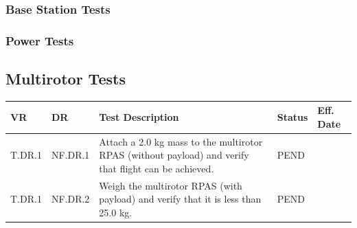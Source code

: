 \documentclass[10pt,letterpaper]{article}
\begin{document}
\subsubsection{Base Station Tests}
\subsubsection{Power Tests}

\subsection{Multirotor Tests}
\begin{table}[H]
\begin{tabular}{ |p{1.1cm}|p{1.3cm}|p{9cm}|p{1.1cm}|p{1.7cm}|}
\hline
\textbf{VR}     & \textbf{DR}      & \textbf{Test Description}  	& \textbf{Status} & \textbf{Eff. Date} \\ \hline
T.DR.1 & NF.DR.1 & Attach a 2.0 kg mass to the multirotor RPAS (without payload) and verify that flight can be achieved. & PEND   & \\ \hline
T.DR.1 & NF.DR.2 & Weigh the multirotor RPAS (with payload) and verify that it is less than 25.0 kg. & PEND   & \\ \hline
\end{tabular}
\end{table}

\clearpage
{}



\end{document}

